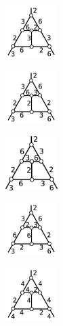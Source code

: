 \documentclass[suppldata, dvipdfmx]{interact}
\theoremstyle{plain}%
\theoremstyle{definition}
\theoremstyle{remark}
\theoremstyle{problemstyle}
\begin{document}
\begin{figure}[h!tbp]
\begin{minipage}[t]{0.99\textwidth}
\begin{minipage}[t]{0.15\textwidth}
   \centering
   \includegraphics[width=0.8in, keepaspectratio]{./img/HexahedraWithSphericalFaces/cube/cube_e.jpg}
   \label{fig:cube_e}
  \end{minipage}
 \hspace*{\fill}
\begin{minipage}[t]{0.15\textwidth}
   \centering
   \includegraphics[width=0.8in,
 keepaspectratio]{./img/HexahedraWithSphericalFaces/cube/cube_f.jpg}
   \label{fig:cube_f}
  \end{minipage}
 \hspace*{\fill}
  \begin{minipage}[t]{0.15\textwidth}
   \centering
   \includegraphics[width=0.8in,
   keepaspectratio]{./img/HexahedraWithSphericalFaces/cube/cube_g.jpg}
   \label{fig:cube_g}
  \end{minipage}
  \hspace*{\fill}
  \begin{minipage}[t]{0.15\textwidth}
   \centering
   \includegraphics[width=0.8in, keepaspectratio]{./img/HexahedraWithSphericalFaces/cube/cube_h.jpg}
   \label{fig:cube_h}
  \end{minipage}
 \hspace*{\fill}
  \begin{minipage}[t]{0.15\textwidth}
   \centering
   \includegraphics[width=0.8in, keepaspectratio]{./img/HexahedraWithSphericalFaces/cube/cube_i.jpg}

\end{minipage}
\end{minipage}
\end{figure}
\end{document}
